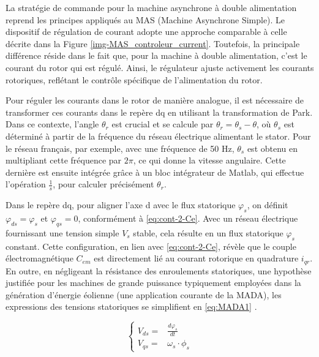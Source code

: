 La stratégie de commande pour la machine asynchrone à double alimentation reprend les principes appliqués au MAS (Machine Asynchrone Simple). Le dispositif de régulation de courant adopte une approche comparable à celle décrite dans la Figure \ref{img-MAS_controleur_current}. Toutefois, la principale différence réside dans le fait que, pour la machine à double alimentation, c’est le courant du rotor qui est régulé. Ainsi, le régulateur ajuste activement les courants rotoriques, reflétant le contrôle spécifique de l'alimentation du rotor.

Pour réguler les courants dans le rotor de manière analogue, il est nécessaire de transformer ces courants dans le repère dq en utilisant la transformation de Park. Dans ce contexte, l'angle \(\theta_r\) est crucial et se calcule par \(\theta_r = \theta_s - \theta\), où \(\theta_s\) est déterminé à partir de la fréquence du réseau électrique alimentant le stator. Pour le réseau français, par exemple, avec une fréquence de 50 Hz, \(\theta_s\) est obtenu en multipliant cette fréquence par \(2\pi\), ce qui donne la vitesse angulaire. Cette dernière est ensuite intégrée grâce à un bloc intégrateur de Matlab, qui effectue l'opération \(\frac{1}{s}\), pour calculer précisément \(\theta_r\).

Dans le repère dq, pour aligner l'axe d avec le flux statorique \(\varphi_s\), on définit \(\varphi_{ds} = \varphi_s\) et \(\varphi_{qs} = 0\), conformément à \ref{eq:cont-2-Ce}. Avec un réseau électrique fournissant une tension simple \(V_s\) stable, cela résulte en un flux statorique \(\varphi_s\) constant. Cette configuration, en lien avec \ref{eq:cont-2-Ce}, révèle que le couple électromagnétique \(C_{em}\) est directement lié au courant rotorique en quadrature \(i_{qr}\). En outre, en négligeant la résistance des enroulements statoriques, une hypothèse justifiée pour les machines de grande puissance typiquement employées dans la génération d'énergie éolienne (une application courante de la MADA), les expressions des tensions statoriques se simplifient en \ref{eq:MADA1} \cite{Boyette2006}.


\begin{equation}
    \left\{
    \begin{aligned}
        V_{ds} =& \frac{d\varphi_s}{dt} \\
        V_{qs} =& \omega_s \cdot \phi_s
    \end{aligned}
    \right.
    \label{eq:MADA1}
\end{equation}

